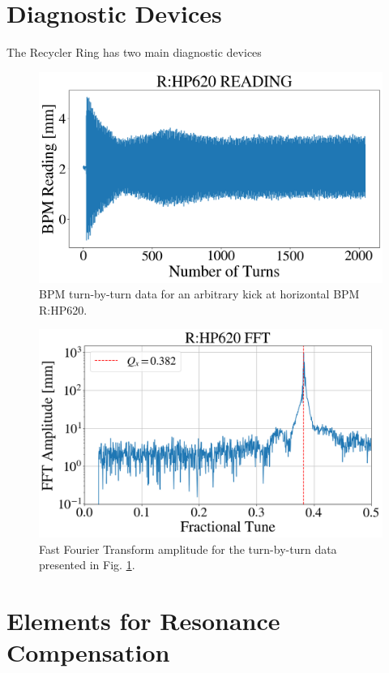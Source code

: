 \section{Diagnostic Devices}

The Recycler Ring has two main diagnostic devices 

\begin{figure}[H]
   \centering
   \includegraphics[width=\columnwidth]{chapter3/bpm_kick.png}
   \caption{BPM turn-by-turn data for an arbitrary kick at horizontal BPM R:HP620.}
   \label{fig:bpmkick}
\end{figure}

\begin{figure}[H]
   \centering
   \includegraphics[width=\columnwidth]{chapter3/bpm_fft.png}
   \caption{Fast Fourier Transform amplitude for the turn-by-turn data presented in Fig. \ref{fig:bpmkick}.}
   \label{fig:bpmfft}
\end{figure}

\section{Elements for Resonance Compensation}


